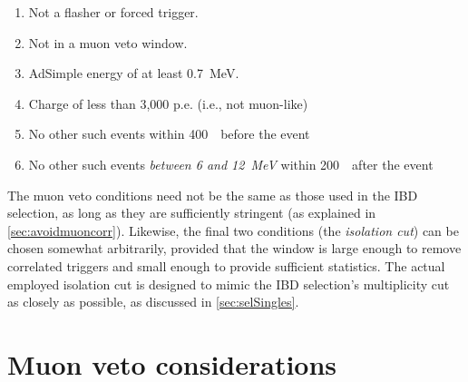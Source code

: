 \documentclass[../thesis.tex]{subfiles}
\begin{document}

\begin{enumerate}
\item Not a flasher or forced trigger.
\item Not in a muon veto window.
\item AdSimple energy of at least 0.7~MeV.
\item Charge of less than 3,000 p.e. (i.e., not muon-like)
\item No other such events within 400~\us\ before the event
\item No other such events \emph{between 6 and 12~MeV} within 200~\us\ after the event
\end{enumerate}

The muon veto conditions need not be the same as those used in the IBD selection, as long as they are sufficiently stringent (as explained in \autoref{sec:avoidmuoncorr}). Likewise, the final two conditions (the \emph{isolation cut}) can be chosen somewhat arbitrarily, provided that the window is large enough to remove correlated triggers and small enough to provide sufficient statistics. The actual employed isolation cut is designed to mimic the IBD selection's multiplicity cut as closely as possible, as discussed in \autoref{sec:selSingles}.

\section{Muon veto considerations}
\label{sec:muonventoconsider}
\end{document}
